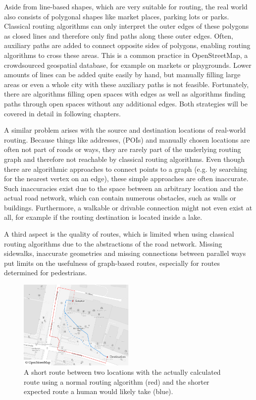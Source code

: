 	Aside from line-based shapes, which are very suitable for routing, the real world also consists of polygonal shapes like market places, parking lots or parks.
	Classical routing algorithms can only interpret the outer edges of these polygons as closed lines and therefore only find paths along these outer edges.
	Often, auxiliary paths are added to connect opposite sides of polygons, enabling routing algorithms to cross these areas.
	This is a common practice in OpenStreetMap, a crowdsourced geospatial database, for example on markets or playgrounds.
	Lower amounts of lines can be added quite easily by hand, but manually filling large areas or even a whole city with these auxiliary paths is not feasible.
	Fortunately, there are algorithms filling open spaces with edges as well as algorithms finding paths through open spaces without any additional edges.
	Both strategies will be covered in detail in following chapters.
	
	A similar problem arises with the source and destination locations of real-world routing.
	Because things like addresses,  (POIs) and manually chosen locations are often not part of roads or ways, they are rarely part of the underlying routing graph and therefore not reachable by classical routing algorithms.
	Even though there are algorithmic approaches to connect points to a graph (e.g. by searching for the nearest vertex on an edge), these simple approaches are often inaccurate.
	Such inaccuracies exist due to the space between an arbitrary location and the actual road network, which can contain numerous obstacles, such as walls or buildings.
	Furthermore, a walkable or drivable connection might not even exist at all, for example if the routing destination is located inside a lake.
	
	A third aspect is the quality of routes, which is limited when using classical routing algorithms due to the abstractions of the road network.
	Missing sidewalks, inaccurate geometries and missing connections between parallel ways put limits on the usefulness of graph-based routes, especially for routes determined for pedestrians.
	
	\begin{figure}[h]
		\begin{figcenter}
			\includegraphics[width=0.5\textwidth]{images/qgis-routing-osterstrasse-expected-vs-routing}
		\end{figcenter}
		\caption{A short route between two locations with the actually calculated route using a normal routing algorithm (red) and the shorter expected route a human would likely take (blue).}
		\label{fig:osterstrasse-routing-vs-expected}
	\end{figure}
	
